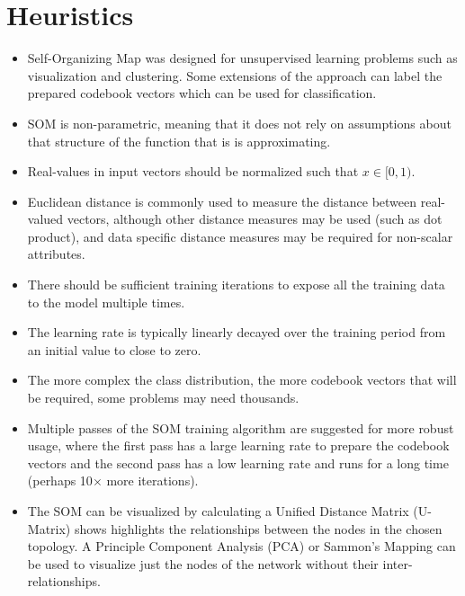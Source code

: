 \documentclass[a4paper, 11pt]{article}
\begin{document}
\section{Heuristics}
\label{sec:heuristics}
\begin{itemize}
	\item Self-Organizing Map was designed for unsupervised learning problems such as visualization and clustering. Some extensions of the approach can label the prepared codebook vectors which can be used for classification.
	\item SOM is non-parametric, meaning that it does not rely on assumptions about that structure of the function that is is approximating.
	\item Real-values in input vectors should be normalized such that $x \in [0,1)$. 
	\item Euclidean distance is commonly used to measure the distance between real-valued vectors, although other distance measures may be used (such as dot product), and data specific distance measures may be required for non-scalar attributes.
	\item There should be sufficient training iterations to expose all the training data to the model multiple times.
	\item The learning rate is typically linearly decayed over the training period from an initial value to close to zero.
	\item The more complex the class distribution, the more codebook vectors that will be required, some problems may need thousands.
	\item Multiple passes of the SOM training algorithm are suggested for more robust usage, where the first pass has a large learning rate to prepare the codebook vectors and the second pass has a low learning rate and runs for a long time (perhaps 10$\times$ more iterations).
	\item The SOM can be visualized by calculating a Unified Distance Matrix (U-Matrix) shows highlights the relationships between the nodes in the chosen topology. A Principle Component Analysis (PCA) or Sammon's Mapping can be used to visualize just the nodes of the network without their inter-relationships.

\end{itemize}
\end{document}
